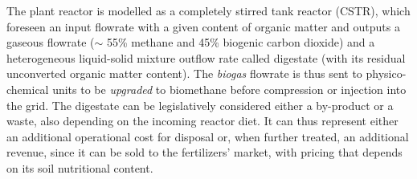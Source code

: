 The plant reactor is modelled as a completely stirred tank reactor (CSTR), which foreseen an input flowrate with a given content of organic matter and outputs a gaseous flowrate ($\sim$ 55\% methane and 45\% biogenic carbon dioxide) and a heterogeneous liquid-solid mixture outflow rate called digestate (with its residual unconverted organic matter content). The \emph{biogas} flowrate is thus sent to physico-chemical units to be \emph{upgraded} to biomethane before compression or injection into the grid.
The digestate can be legislatively considered either a by-product or a waste, also depending on the incoming reactor diet. It can thus represent either an additional operational cost for disposal or, when further treated, an additional revenue, since it can be sold to the fertilizers' market, with pricing that depends on its soil nutritional content.  

